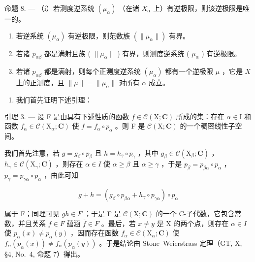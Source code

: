 命题 8. --- （i）若测度逆系统 \((\mu_{\alpha})\) （在诸 \(X_{\alpha}\) 上）有逆极限，则该逆极限是唯一的。

\begin{enumerate}
\def\labelenumi{(\roman{enumi})}
\setcounter{enumi}{1}
\item
  若逆系统 \((\mu_{\alpha})\) 有逆极限，则范数族 \((\| \mu_{\alpha}\|)\) 有界。
\item
  若诸 \(p_{\alpha\beta}\) 都是满射且族 ( \(\|\mu_{\alpha}\|\) ) 有界，则测度逆系统 ( \(\mu_{\alpha}\) ) 有逆极限。
\item
  若诸 \(p_{\alpha \beta}\) 都是满射，则每个正测度逆系统 \((\mu_{\alpha})\) 都有一个逆极限 \(\mu\) ，它是 \(X\) 上的正测度，且 \(\| \mu \| = \| \mu_{\alpha} \|\) 对所有 \(\alpha\) 成立。
\end{enumerate}

\begin{enumerate}
\def\labelenumi{(\roman{enumi})}
\tightlist
\item
  我们首先证明下述引理：
\end{enumerate}

引理 3. --- 设 F 是由具有下述性质的函数 \(f \in \mathcal{C}(\mathrm{X};\mathbf{C})\) 所成的集：存在 \(\alpha \in \mathrm{I}\) 和函数 \(f_{\alpha} \in \mathcal{C}(\mathrm{X}_{\alpha};\mathbf{C})\) 使 \(f = f_{\alpha} \circ p_{\alpha}\) 。则 F 是 \(\mathcal{C}(\mathrm{X};\mathbf{C})\) 的一个稠密线性子空间。

我们首先注意，若 \(g = g_{\beta} \circ p_{\beta}\) 且 \(h = h_{\gamma} \circ p_{\gamma}\) ，其中 \(g_{\beta} \in \mathcal{C}(\mathrm{X}_{\beta}; \mathbf{C})\) ，\(h_{\gamma} \in \mathcal{C}(\mathrm{X}_{\gamma}; \mathbf{C})\) ，则存在 \(\alpha \in I\) 使 \(\alpha \geqslant \beta\) 且 \(\alpha \geqslant \gamma\) ，于是 \(p_{\beta} = p_{\beta\alpha} \circ p_{\alpha}\) ，\(p_{\gamma} = p_{\gamma\alpha} \circ p_{\alpha}\) ，由此可知

\[
g + h = \left(g _ {\beta} \circ p _ {\beta \alpha} + h _ {\gamma} \circ p _ {\gamma \alpha}\right) \circ p _ {\alpha}
\]

属于 F；同理可见 \(gh \in F\) ；于是 F 是 \(\mathcal{C}(\mathrm{X};\mathbf{C})\) 的一个 C-子代数，它包含常数，并且关系 \(f \in F\) 蕴涵 \(\overline{f} \in F\) 。最后，若 \(x \neq y\) 是 X 的两个点，则存在 \(\alpha \in I\) 使 \(p_{\alpha}(x) \neq p_{\alpha}(y)\) ，因而存在函数 \(f_{\alpha} \in \mathcal{C}(\mathrm{X}_{\alpha};\mathbf{C})\) 使 \(f_{\alpha}(p_{\alpha}(x)) \neq f_{\alpha}(p_{\alpha}(y))\) 。于是结论由 Stone--Weierstrass 定理（GT, X, §4, No.~4, 命题 7）得出。

